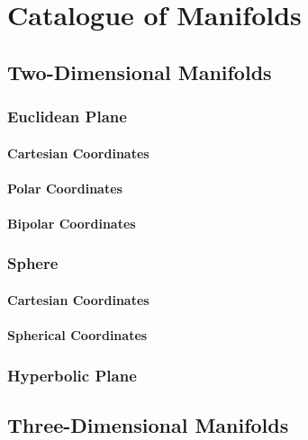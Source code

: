 \chapter{Catalogue of Manifolds}
\label{chapter:Geometric-Foundations}


\section{Two-Dimensional Manifolds}

\subsection{Euclidean Plane}

\subsubsection*{Cartesian Coordinates}

\subsubsection*{Polar Coordinates}

\subsubsection*{Bipolar Coordinates}

\subsection{Sphere}

\subsubsection*{Cartesian Coordinates}

\subsubsection*{Spherical Coordinates}

\subsection{Hyperbolic Plane}

\section{Three-Dimensional Manifolds}

